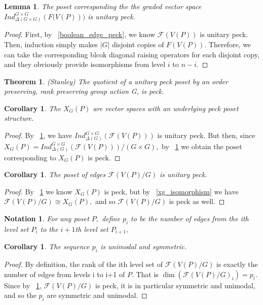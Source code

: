\documentclass{amsart}
\newtheorem{cor}[subsubsection]{Corollary}
\newtheorem{lem}[subsubsection]{Lemma}
\newtheorem{thm}[subsubsection]{Theorem}
\newtheorem{note}[subsubsection]{Notation}
\begin{document}
\begin{lem}
\label{unitary_peck_induction}
The poset corresponding the the graded vector space $Ind_{\Delta(G\times G)}^{G\times G}(F\mathcal (V(P)))$ is unitary peck. 
\end{lem}
\begin{proof}
First, by ~\ref{boolean_edge_peck}, we know $\mathcal F(V(P))$ is unitary peck. Then, induction simply makes $|G|$ disjoint copies of $F(V(P)).$ Therefore, we can take the corresponding blcok diagonal raising operators for each disjoint copy, and they obviously provide isomorphisms from level $i$ to $n-i.$
\end{proof}

\begin{thm}
\label{quotient_is_peck}
(Stanley) The quotient of a unitary peck poset by an order preserving, rank preserving group action G, is peck.
\end{thm}

\begin{cor}
\label{xg_peck}
The $X_G(P)$ are vector spaces with an underlying peck poset structure.
\end{cor}
\begin{proof}
By ~\ref{unitary_peck_induction}, we have $Ind_{\Delta(G)}^{G\times G}(\mathcal F(V(P)))$ is unitary peck. But then, since $X_G(P) = Ind_{\Delta(G)}^{G\times G}(\mathcal F(V(P)))/(G\times G),$ by ~\ref{quotient_is_peck} we obtain the poset corresponding to $X_G(P)$ is peck. 
\end{proof}

\begin{cor}
\label{edges_peck}
The poset of edges $\mathcal F(V(P)/G)$ is unitary peck.
\end{cor}
\begin{proof}
By ~\ref{xg_peck} we know $X_G(P)$ is peck, but by ~\ref{xg_isomorphism} we have $\mathcal F(V(P)/G)\cong X_G(P),$ and so $\mathcal F(V(P)/G)$ is peck as well.
\end{proof}

\begin{note}
For any poset $P,$ define $p_i$ to be the number of edges from the ith level set $P_i$ to the $i+1$th level set $P_{i+1},$
\end{note}

\begin{cor}
The sequence $p_i$ is unimodal and symmetric.
\end{cor}
\begin{proof}
By definition, the rank of the ith level set of $\mathcal F(V(P)/G)$ is exactly the number of edges from levels i to i+1 of $P.$ That is $\dim(\mathcal F(V(P)/G)_i) = p_i.$ Since by ~\ref{edges_peck}, $\mathcal F(V(P)/G)$ is peck, it is in particular symmetric and unimodal, and so the $p_i$ are symmetric and unimodal.
\end{proof}
\end{document}
